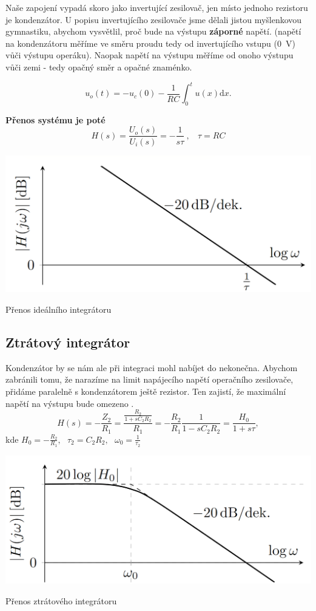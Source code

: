 \documentclass[a4paper,12pt]{article}   %
\begin{document}
Naše zapojení vypadá skoro jako invertující zesilovač, jen místo jednoho rezistoru je kondenzátor. U popisu invertujícího zesilovače jsme dělali jistou myšlenkovou gymnastiku, abychom vysvětlil, proč bude na výstupu \textbf{záporné} napětí. (napětí na kondenzátoru měříme ve směru proudu tedy od invertujícího vstupu (0~V) vůči výstupu operáku). Naopak napětí na výstupu měříme od onoho výstupu vůči zemi - tedy opačný směr a opačné znaménko.

\begin{equation*}
    u_o(t) = - u_c(0) - \frac{1}{RC}\int_0^t u(x)\text{d}x.
\end{equation*}

\textbf{Přenos systému je poté}
\begin{equation}
    H(s) = \frac{U_o(s)}{U_i(s)} = -\frac{1}{s\tau}~,~~~~\tau = RC
\end{equation}
\begin{graf}
    \centering
    \includegraphics[width=.7\textwidth]{integrator-ideal-prenos.PNG}
    \caption{Přenos ideálního integrátoru}
\end{graf}

\subsection*{Ztrátový integrátor}
Kondenzátor by se nám ale při integraci mohl nabíjet do nekonečna. Abychom zabránili tomu, že narazíme na limit napájecího napětí operačního zesilovače, přidáme paralelně s kondenzátorem ještě rezistor. Ten zajistí, že maximální napětí na výstupu bude omezeno .
\begin{equation}
    H(s) = -\frac{Z_2}{R_1} = \frac{\frac{R_2}{1+sC_2R_2}}{R_1} = -\frac{R_2}{R_1}\frac{1}{1-sC_2R_2} = \frac{H_0}{1+s\tau},
\end{equation}
kde $H_0 = -\frac{R_2}{R_1},~~~\tau_2 = C_2 R_2,~~~\omega_0 = \frac{1}{\tau_2}$
\begin{graf}
    \centering
    \includegraphics[width=.7\textwidth]{integrator-real-prenos.PNG}
    \caption{Přenos ztrátového integrátoru}
\end{graf}
\end{document}
